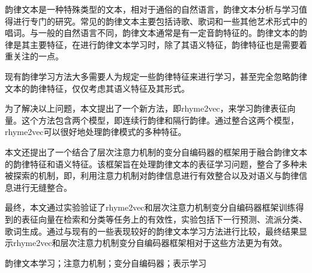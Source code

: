 

\begin{zhaiyao}
韵律文本是一种特殊类型的文本，相对于通俗的自然语言，韵律文本分析与学习值得进行专门的研究。常见的韵律文本主要包括诗歌、歌词和一些其他艺术形式中的唱词。与一般的自然语言不同，韵律文本通常是有一定音韵特征的。韵律文本的韵律是其主要特征，在进行韵律文本学习时，除了其语义特征，韵律特征也是需要着重关注的一点。\par

现有韵律学习方法大多需要人为规定一些韵律特征来进行学习，甚至完全忽略韵律文本的韵律特征，仅仅考虑其语义特征及其形式。\par

为了解决以上问题，本文提出了一个新方法，即rhyme2vec，来学习韵律表征向量。这个方法包含两个模型，即连续行韵律和隔行韵律。通过整合这两个模型，rhyme2vec可以很好地处理韵律模式的多种特征。\par

本文还提出了一个结合了层次注意力机制的变分自编码器的框架用于融合韵律文本的韵律特征和语义特征。该框架旨在处理韵律文本的表征学习问题，整合了多种未被探索的机制，即，利用注意力机制对韵律信息进行有效整合以及对语义与韵律信息进行无缝整合。\par

最终，本文通过实验验证了rhyme2vec和层次注意力机制变分自编码器框架训练得到的表征向量在检索和分类等任务上的有效性，实验包括下一行预测、流派分类、歌词生成。通过与现有的一些表现较好的韵律文本学习方法进行比较，最终结果显示rhyme2vec和层次注意力机制变分自编码器框架相对于这些方法更为有效。


\end{zhaiyao}




\begin{guanjianci}
韵律文本学习；注意力机制；变分自编码器；表示学习
\end{guanjianci}



